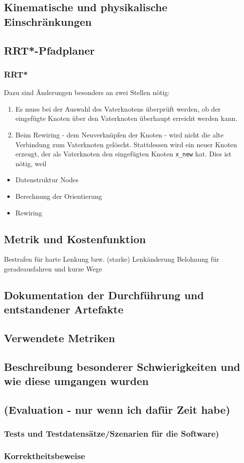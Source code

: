 \subsection{Kinematische und physikalische Einschränkungen}


\subsection{RRT*-Pfadplaner}

\subsubsection{RRT* }
Dazu sind Änderungen besonders an zwei Stellen nötig: 
\begin{enumerate}
\item Es muss bei der Auswahl des Vaterknotens überprüft werden, ob der eingefügte Knoten über den Vaterknoten überhaupt erreicht werden kann.
\item Beim Rewiring - dem Neuverknüpfen der Knoten - wird nicht die alte Verbindung zum Vaterknoten gelöscht. Stattdessen wird ein neuer Knoten erzeugt, der als Vaterknoten den eingefügten Knoten \verb|x_new| hat. Dies ist nötig, weil 
\end{enumerate}

\begin{itemize}
\item  Datenstruktur Nodes
\item Berechnung der Orientierung
\item Rewiring
\end{itemize}
\subsection{Metrik und Kostenfunktion}
Bestrafen für harte Lenkung bzw. (starke) Lenkänderung
Belohnung für geradeausfahren und kurze Wege




\subsection{Dokumentation der Durchführung und entstandener Artefakte}
\subsection{Verwendete Metriken}
\subsection{Beschreibung besonderer Schwierigkeiten und wie diese umgangen wurden}
\subsection{(Evaluation - nur wenn ich dafür Zeit habe)}


\subsubsection{Tests und Testdatensätze/Szenarien für die Software)}
\subsubsection{Korrektheitsbeweise}
